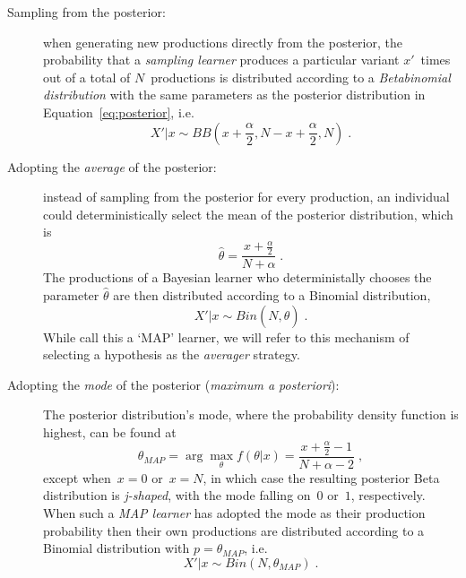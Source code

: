 \begin{description}
\item[Sampling from the posterior:] when generating new productions directly from the posterior, the probability that a \emph{sampling learner} produces a particular variant $x'$~times out of a total of $N$~productions is distributed according to a \emph{Betabinomial distribution} with the same parameters as the posterior distribution in Equation~\ref{eq:posterior}, i.e.
\begin{equation}\label{eq:usmsampling}
X'|x \sim BB(x+\frac{\alpha}{2}, N-x+\frac{\alpha}{2}, N) \;.
\end{equation}

\item[Adopting the \emph{average} of the posterior:] instead of sampling from the posterior for every production, an individual could deterministically select the mean of the posterior distribution, which is
\begin{equation}\label{eq:usmaveraging}
\hat{\theta}=\frac{x+\frac{\alpha}{2}}{N+\alpha}\;.%
\end{equation}
The productions of a Bayesian learner who deterministally chooses the parameter $\hat{\theta}$ are then distributed according to a Binomial %
distribution,
\begin{equation}\label{eq:usmmap}
X'|x \sim Bin(N, \hat{\theta}) \;.
\end{equation}
While \citet{Reali2009} call this a `MAP' learner, we will refer to this mechanism of selecting a hypothesis as the \emph{averager} strategy.

\item[Adopting the \emph{mode} of the posterior (\emph{maximum a posteriori}):] The posterior distribution's mode, where the probability density function is highest, can be found at
\begin{equation}
\theta_{MAP} = \arg\max_{\theta} f(\theta|x) = \frac{x+\frac{\alpha}{2}-1}{N+\alpha-2}\;,
\end{equation}
except when~$x=0$ or~$x=N$, in which case the resulting posterior Beta distribution is \emph{j-shaped}, with the mode falling on~$0$ or~$1$, respectively. When such a \emph{MAP learner} has adopted the mode as their production probability then their own productions are distributed according to a Binomial distribution with $p=\theta_{MAP}$, i.e.
\begin{equation}
X'|x \sim Bin(N, \theta_{MAP}) \;.
\end{equation}
\end{description}

